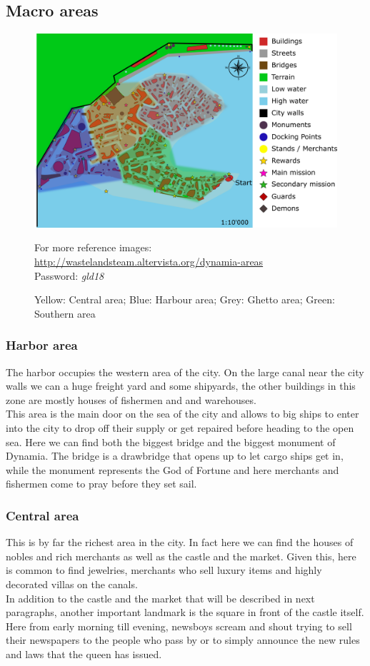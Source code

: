 \subsection {Macro areas}
\begin{figure}[H]
    \centering
    \includegraphics[width=\textwidth]{Images/Maps/dynamiaAreas}
    \caption{Yellow: Central area; Blue: Harbour area; Grey: Ghetto area; Green: Southern area}
    For more reference images: \href{http://wastelandsteam.altervista.org/dynamia-dead-end}{http://wastelandsteam.altervista.org/dynamia-areas}\\Password: \textit{gld18}
  \end{figure}
\subsubsection{Harbor area}
The harbor occupies the western area of the city. On the large canal near the city walls we can a huge freight yard and some shipyards, the  other buildings in this zone are mostly houses of fishermen and and warehouses.\\
This area is the main door on the sea of the city and allows to big ships to enter into the city to drop off their supply or get repaired before heading to the open sea. Here we can find both the biggest bridge and the biggest monument of Dynamia. The bridge is a drawbridge that opens up to let cargo ships get in, while the monument represents the God of Fortune and here merchants and fishermen come to pray before they set sail.\\
\subsubsection{Central area}
This is by far the richest area in the city. In fact here we can find the houses of  nobles and rich merchants as well as the castle and the market. Given this, here is common to find jewelries, merchants who sell luxury items and highly decorated villas on the canals. \\
In addition to the castle and the market that will be described in next paragraphs, another important landmark is the square in front of the castle itself. Here from early morning till evening, newsboys scream and shout trying to sell their newspapers to the people who pass by  or to simply announce the new rules and laws that the queen has issued.
